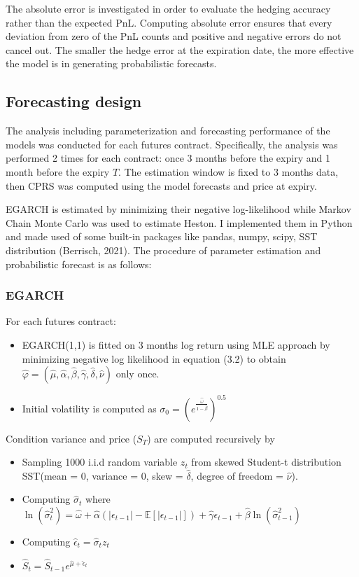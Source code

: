 \documentclass[12pt,a4paper]{article}
\numberwithin{equation}{section}
\begin{document}
The absolute error is investigated in order to evaluate the hedging accuracy rather than the expected PnL. Computing absolute error ensures that every deviation from zero of the PnL counts and positive and negative errors do not cancel out. The smaller the hedge error at the expiration date, the more effective the model is in generating probabilistic forecasts.


\subsection{Forecasting design}

The analysis including parameterization and forecasting performance of the models was conducted for each futures contract. Specifically, the analysis was performed 2 times for each contract: once 3 months before the expiry and 1 month before the expiry $T$. The estimation window is fixed to 3 months data, then CPRS was computed using the model forecasts and price at expiry.

EGARCH is estimated by minimizing their negative log-likelihood while Markov Chain Monte Carlo was used to estimate Heston. I implemented them in Python and made used of some built-in packages like pandas, numpy, scipy, SST distribution (Berrisch, 2021). The procedure of parameter estimation and probabilistic forecast is as follows:

\subsubsection{EGARCH}

For each futures contract:

\begin{itemize}
\item EGARCH(1,1) is fitted on 3 months log return using MLE approach by minimizing negative log likelihood in equation (3.2) to obtain $ \hat{\varphi} = (\hat{\mu}, \hat{\alpha}, \hat{\beta}, \hat{\gamma}, \hat{\delta}, \hat{\nu})$ only once.
\item Initial volatility is computed as $\sigma_0 = (e^{\frac{\hat{\omega}}{1-\hat{\beta}}})^{0.5}$
\end{itemize}

Condition variance and price ($S_T$) are computed recursively by 

\begin{itemize}
\item Sampling 1000 i.i.d random variable $z_t$ from skewed Student-t distribution SST(mean = 0, variance = 0, skew = $\hat{\delta}$, degree of freedom = $\hat{\nu}$).
\item Computing $\hat{\sigma}_t$ where $ \ln\left(\hat{\sigma}_t^2\right) = \hat{\omega} + \hat{\alpha} \left( |\epsilon_{t-1}| - \mathbb{E}[|\epsilon_{t-1}|] \right) + \hat{\gamma} \epsilon_{t-1} +  \hat{\beta} \ln\left(\hat{\sigma}_{t-1}^2\right)$
\item Computing $\hat{\epsilon}_t = \hat{\sigma}_t z_t $
\item $\hat{S}_t = \hat{S}_{t-1} e^{\hat{\mu} + \hat{\epsilon}_t}$
\end{itemize}
\end{document}
